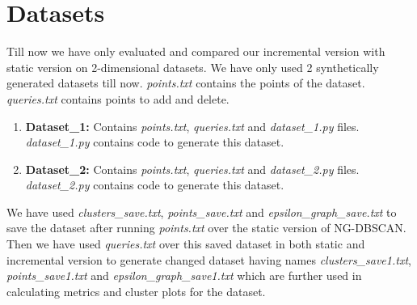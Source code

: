 \documentclass[acmsmall]{acmart}
\begin{document}
\section*{Datasets}
Till now we have only evaluated and compared our incremental version with static version on 2-dimensional datasets. We have only used 2 synthetically generated datasets till now. \textit{points.txt} contains the points of the dataset. \textit{queries.txt} contains points to add and delete.
\begin{enumerate}
    \item \textbf{Dataset\_1: }Contains \textit{points.txt}, \textit{queries.txt} and \textit{dataset\_1.py} files. \textit{dataset\_1.py} contains code to generate this dataset.
    \item \textbf{Dataset\_2: }Contains \textit{points.txt}, \textit{queries.txt} and \textit{dataset\_2.py} files. \textit{dataset\_2.py} contains code to generate this dataset.
\end{enumerate}
We have used \textit{clusters\_save.txt}, \textit{points\_save.txt} and \textit{epsilon\_graph\_save.txt} to save the dataset after running \textit{points.txt} over the static version of NG-DBSCAN. Then we have used \textit{queries.txt} over this saved dataset in both static and incremental version to generate changed dataset having names \textit{clusters\_save1.txt}, \textit{points\_save1.txt} and \textit{epsilon\_graph\_save1.txt} which are further used in calculating metrics and cluster plots for the dataset.
\end{document}
